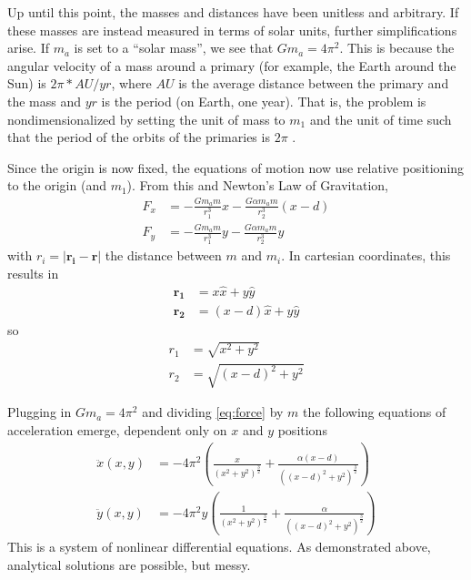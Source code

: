 \documentclass[preprint,titlepage,preprintnumbers,amsmath,amssymb,aps,11pt]{revtex4-2}
\begin{document}
Up until this point, the masses and distances have been unitless and arbitrary. If these masses are instead measured in terms of solar units, further simplifications arise. If $m_a$ is set to a ``solar mass'', we see that $Gm_a=4\pi^2$. This is because the angular velocity of a mass around a primary (for example, the Earth around the Sun) is $2\pi*AU/yr$, where $AU$ is the average distance between the primary and the mass and $yr$ is the period (on Earth, one year). That is, the problem is nondimensionalized by setting the unit of mass to $m_1$ and the unit of time such that the period of the orbits of the primaries is $2\pi$ \cite{Wild1980,Worthington2012}.

Since the origin is now fixed, the equations of motion now use relative positioning to the origin (and $m_1$). From this and Newton's Law of Gravitation,
\begin{equation}
    \begin{aligned}
        F_x & =-\frac{Gm_a m}{r_1^3}x-\frac{G\alpha m_a m}{r_2^3}(x-d) \\
        F_y & =-\frac{Gm_a m}{r_1^3}y-\frac{G\alpha m_a m}{r_2^3}y
    \end{aligned}
    \label{eq:force}
\end{equation}
with $r_i=|\bm{r_i}-\bm{r}|$ the distance between $m$ and $m_i$. In cartesian coordinates, this results in
\begin{equation}
    \begin{aligned}
        \bm{r_1} & =x\hat{x}+y\hat{y}     \\
        \bm{r_2} & =(x-d)\hat{x}+y\hat{y}
    \end{aligned}
\end{equation}
so
\begin{equation}
    \begin{aligned}
        r_1 & =\sqrt{x^2+y^2}     \\
        r_2 & =\sqrt{(x-d)^2+y^2}
    \end{aligned}
\end{equation}

Plugging in $Gm_a=4\pi^2$ and dividing \ref{eq:force} by $m$ the following equations of acceleration emerge, dependent only on $x$ and $y$ positions
\begin{equation}
    \begin{aligned}
        \ddot{x}(x,y) & = -4\pi^2(\frac{x}{(x^2+y^2)^{\frac{3}{2}}}+\frac{\alpha(x-d)}{((x-d)^2+y^2)^{\frac{3}{2}}}) \\
        \ddot{y}(x,y) & = -4\pi^2y(\frac{1}{(x^2+y^2)^{\frac{3}{2}}}+\frac{\alpha}{((x-d)^2+y^2)^{\frac{3}{2}}})
    \end{aligned}
\end{equation}
This is a system of nonlinear differential equations. As demonstrated above, analytical solutions are possible, but messy.
\end{document}
